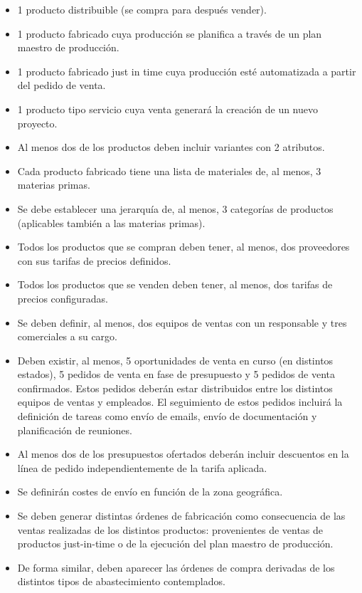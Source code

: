 \begin{itemize}
    \item 1 producto distribuible (se compra para después vender).
    \item 1 producto fabricado cuya producción se planifica a través de un plan maestro de producción.
    \item 1 producto fabricado just in time cuya producción esté automatizada a partir del pedido de venta.
    \item 1 producto tipo servicio cuya venta generará la creación de un nuevo proyecto.
    \item Al menos dos de los productos deben incluir variantes con 2 atributos.
    \item Cada producto fabricado tiene una lista de materiales de, al menos, 3 materias primas.
    \item Se debe establecer una jerarquía de, al menos, 3 categorías de productos (aplicables también a las materias
    primas).
    \item Todos los productos que se compran deben tener, al menos, dos proveedores con sus tarifas de precios
    definidos.
    \item Todos los productos que se venden deben tener, al menos, dos tarifas de precios configuradas.
    \item Se deben definir, al menos, dos equipos de ventas con un responsable y tres comerciales a su cargo.
    \item Deben existir, al menos, 5 oportunidades de venta en curso (en distintos estados), 5 pedidos de venta en fase de presupuesto y 5 pedidos de venta confirmados. Estos pedidos deberán estar distribuidos entre los distintos equipos de ventas y empleados. El seguimiento de estos pedidos incluirá la definición de tareas como envío de emails, envío de documentación y planificación de reuniones.
    \item Al menos dos de los presupuestos ofertados deberán incluir descuentos en la línea de pedido independientemente de la tarifa aplicada.
    \item Se definirán costes de envío en función de la zona geográfica.
    \item Se deben generar distintas órdenes de fabricación como consecuencia de las ventas realizadas de los distintos productos: provenientes de ventas de productos just-in-time o de la ejecución del plan maestro de producción.
    \item De forma similar, deben aparecer las órdenes de compra derivadas de los distintos tipos de abastecimiento contemplados.

\end{itemize}
